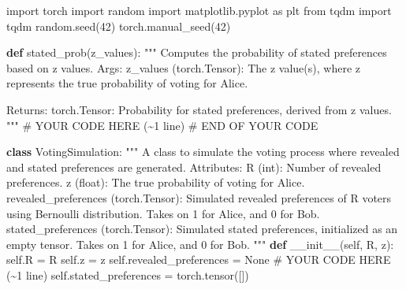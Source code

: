 \documentclass[
  letterpaper,
  numbers=noenddot,
  DIV=11]{scrreprt}
\newenvironment{Shaded}{\begin{snugshade}}{\end{snugshade}}
\newcommand{\CommentTok}[1]{\textcolor[rgb]{0.37,0.37,0.37}{#1}}
\newcommand{\DecValTok}[1]{\textcolor[rgb]{0.68,0.00,0.00}{#1}}
\newcommand{\FunctionTok}[1]{\textcolor[rgb]{0.28,0.35,0.67}{#1}}
\newcommand{\ImportTok}[1]{\textcolor[rgb]{0.00,0.46,0.62}{#1}}
\newcommand{\KeywordTok}[1]{\textcolor[rgb]{0.00,0.23,0.31}{\textbf{#1}}}
\newcommand{\NormalTok}[1]{\textcolor[rgb]{0.00,0.23,0.31}{#1}}
\newcommand{\OperatorTok}[1]{\textcolor[rgb]{0.37,0.37,0.37}{#1}}
\newcommand{\RegionMarkerTok}[1]{\textcolor[rgb]{0.00,0.23,0.31}{#1}}
\newcommand{\VariableTok}[1]{\textcolor[rgb]{0.07,0.07,0.07}{#1}}
\theoremstyle{definition}
\theoremstyle{plain}
\theoremstyle{plain}
\theoremstyle{remark}
\begin{document}
\begin{tcolorbox}[colframe=.grey, title=\faCode \enspace Code]

\begin{Shaded}
\begin{Highlighting}[numbers=left,,]
\ImportTok{import}\NormalTok{ torch}
\ImportTok{import}\NormalTok{ random}
\ImportTok{import}\NormalTok{ matplotlib.pyplot }\ImportTok{as}\NormalTok{ plt}
\ImportTok{from}\NormalTok{ tqdm }\ImportTok{import}\NormalTok{ tqdm}
\NormalTok{random.seed(}\DecValTok{42}\NormalTok{)}
\NormalTok{torch.manual\_seed(}\DecValTok{42}\NormalTok{)}

\KeywordTok{def}\NormalTok{ stated\_prob(z\_values):}
    \CommentTok{"""}
\CommentTok{    Computes the probability of stated preferences based on z values.}
\CommentTok{    }
\CommentTok{    Args:}
\CommentTok{        z\_values (torch.Tensor): The z value(s), where z represents the true probability of voting for Alice.}

\CommentTok{    Returns:}
\CommentTok{        torch.Tensor: Probability for stated preferences, derived from z values.}
\CommentTok{    """}
    \CommentTok{\# YOUR CODE HERE (\textasciitilde{}1 line)}
    \CommentTok{\# }\RegionMarkerTok{END}\CommentTok{ OF YOUR CODE}

\KeywordTok{class}\NormalTok{ VotingSimulation:}
    \CommentTok{"""}
\CommentTok{    A class to simulate the voting process where revealed and stated preferences are generated.}
\CommentTok{    }
\CommentTok{    Attributes:}
\CommentTok{        R (int): Number of revealed preferences.}
\CommentTok{        z (float): The true probability of voting for Alice.}
\CommentTok{        revealed\_preferences (torch.Tensor): Simulated revealed preferences of R voters using Bernoulli distribution.}
\CommentTok{                                             Takes on 1 for Alice, and 0 for Bob.}
\CommentTok{        stated\_preferences (torch.Tensor): Simulated stated preferences, initialized as an empty tensor.}
\CommentTok{                                           Takes on 1 for Alice, and 0 for Bob.}
\CommentTok{    """}
    \KeywordTok{def} \FunctionTok{\_\_init\_\_}\NormalTok{(}\VariableTok{self}\NormalTok{, R, z):}
        \VariableTok{self}\NormalTok{.R }\OperatorTok{=}\NormalTok{ R}
        \VariableTok{self}\NormalTok{.z }\OperatorTok{=}\NormalTok{ z}
        \VariableTok{self}\NormalTok{.revealed\_preferences }\OperatorTok{=} \VariableTok{None} \CommentTok{\# YOUR CODE HERE (\textasciitilde{}1 line)}
        \VariableTok{self}\NormalTok{.stated\_preferences }\OperatorTok{=}\NormalTok{ torch.tensor([])}


\end{Highlighting}
\end{Shaded}
\end{tcolorbox}
\end{document}
